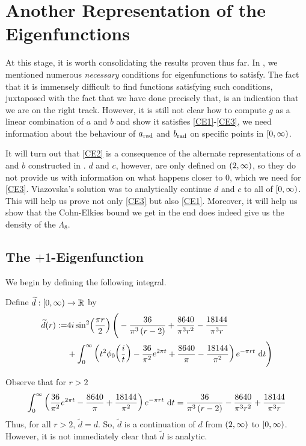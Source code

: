 \section{Another Representation of the Eigenfunctions}
\label{Ch4:Sec:Analytic_Cont}

At this stage, it is worth consolidating the results proven thus far. In , we mentioned numerous \textit{necessary} conditions for eigenfunctions to satisfy. The fact that it is immensely difficult to find functions satisfying such conditions, juxtaposed with the fact that we have done precisely that, is an indication that we are on the right track. However, it is still not clear how to compute $g$ as a linear combination of $a$ and $b$ and show it satisfies \ref{CE1}-\ref{CE3}, we need information about the behaviour of $a_{\operatorname{rad}}$ and $b_{\operatorname{rad}}$ on specific points in $\left[0, \infty\right)$.

It will turn out that \ref{CE2} is a consequence of the alternate representations of $a$ and $b$ constructed in . $d$ and $c$, however, are only defined on $\left( 2, \infty \right)$, so they do not provide us with information on what happens closer to $0$, which we need for \ref{CE3}. Viazovska's solution was to analytically continue $d$ and $c$ to all of $\left[0, \infty\right)$. This will help us prove not only \ref{CE3} but also \ref{CE1}. Moreover, it will help us show that the Cohn-Elkies bound we get in the end does indeed give us the density of the $\Lambda_8$.

\subsection{The $+1$-Eigenfunction}

We begin by defining the following integral.

\begin{boxdefinition}
    Define $\widetilde{d} : \left[0, \infty\right) \to \mathbb{R}$ by
    \begin{align*}
        \widetilde{d}(r) :=&
        4i \sin^2\!\left( \frac{\pi r}{2} \right) \Bigg(
        -\frac{36}{\pi^3\left( r - 2 \right)} + \frac{8640}{\pi^3 r^2} - \frac{18144}{\pi^3 r} \\
        &+\int_{0}^{\infty} \left( t^2 \phi_0\!\left( \frac{i}{t} \right) - \frac{36}{\pi^2}e^{2\pi t} + \frac{8640}{\pi} - \frac{18144}{\pi^2} \right) e^{-\pi r t} \, \operatorname{d}\!{t}\Bigg)
    \end{align*}
\end{boxdefinition}

Observe that for $r > 2$
\begin{align*}
    \int_{0}^{\infty} \left( \frac{36}{\pi^2}e^{2\pi t} - \frac{8640}{\pi} + \frac{18144}{\pi^2} \right) e^{-\pi r t} \, \operatorname{d}\!{t}
    = \frac{36}{\pi^3\left( r - 2 \right)} - \frac{8640}{\pi^3 r^2} + \frac{18144}{\pi^3 r}
\end{align*}
Thus, for all $r > 2$, $\tilde{d} = d$. So, $\tilde{d}$ is a continuation of $d$  from $\left( 2, \infty \right)$ to $\left[0, \infty\right)$. However, it is not immediately clear that $\tilde{d}$ is analytic.

